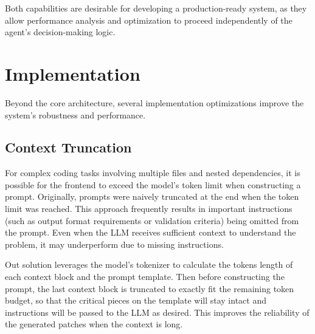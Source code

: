 Both capabilities are desirable for developing a production-ready system, as they allow performance analysis and optimization to proceed independently of the agent's decision-making logic.

\section{Implementation}
Beyond the core architecture, several implementation optimizations improve the system's robustness and performance.

\subsection{Context Truncation}
\label{sec:context_truncation}

For complex coding tasks involving multiple files and nested dependencies, it is possible for the frontend to exceed the model's token limit when constructing a prompt. Originally, prompts were naively truncated at the end when the token limit was reached. This approach frequently results in important instructions (such as output format requirements or validation criteria) being omitted from the prompt. Even when the LLM receives sufficient context to understand the problem, it may underperform due to missing instructions.


Out solution leverages the model’s tokenizer to calculate the tokens length of each context block and the prompt template. Then before constructing the prompt, the last context block is truncated to exactly fit the remaining token budget, so that the critical pieces on the template will stay intact and instructions will be passed to the LLM as desired. This improves the reliability of the generated patches when the context is long.
